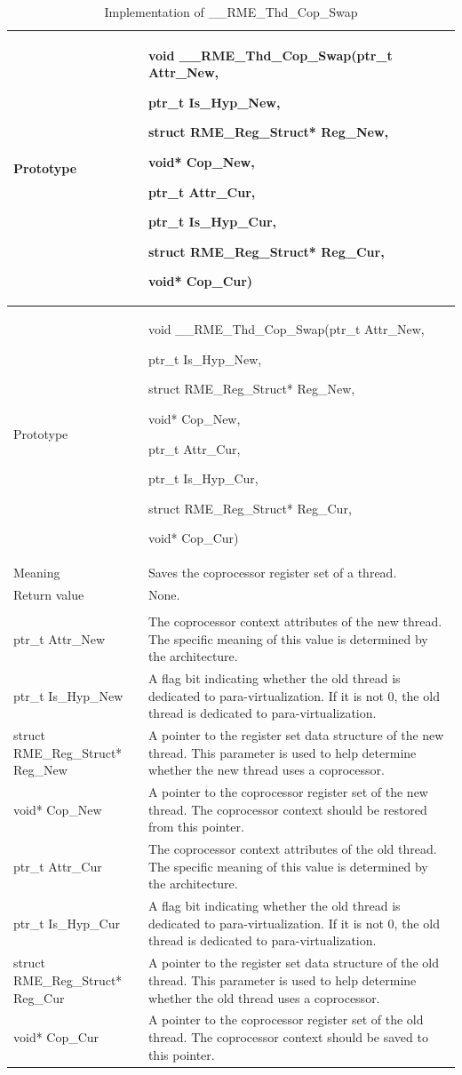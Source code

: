 \begin{xltabular}{\textwidth}{@{}>{\hsize\raggedright\arraybackslash}X>{\hsize\raggedright\arraybackslash}X@{}}
\caption{Implementation of \_\_RME\_Thd\_Cop\_Swap}\label{tab:7-72-rme-thd-cop-swap-implementation}\\
\toprule
Prototype\strut
 & void \_\_RME\_Thd\_Cop\_Swap(ptr\_t Attr\_New,

ptr\_t Is\_Hyp\_New,

struct RME\_Reg\_Struct* Reg\_New,

void* Cop\_New,

ptr\_t Attr\_Cur,

ptr\_t Is\_Hyp\_Cur,

struct RME\_Reg\_Struct* Reg\_Cur,

void* Cop\_Cur)\strut
\tabularnewline
\endfirsthead
\toprule
Prototype\strut
 & void \_\_RME\_Thd\_Cop\_Swap(ptr\_t Attr\_New,

ptr\_t Is\_Hyp\_New,

struct RME\_Reg\_Struct* Reg\_New,

void* Cop\_New,

ptr\_t Attr\_Cur,

ptr\_t Is\_Hyp\_Cur,

struct RME\_Reg\_Struct* Reg\_Cur,

void* Cop\_Cur)\strut
\tabularnewline
\midrule
\endhead
\bottomrule
\endlastfoot
Meaning & Saves the coprocessor register set of a thread.\tabularnewline
Return value & None.\tabularnewline
{}\tabularnewline
ptr\_t Attr\_New & The coprocessor context attributes of the new thread. The specific meaning of this value is determined by the architecture.\tabularnewline
ptr\_t Is\_Hyp\_New & A flag bit indicating whether the old thread is dedicated to para-virtualization. If it is not 0, the old thread is dedicated to para-virtualization.\tabularnewline
struct RME\_Reg\_Struct* Reg\_New & A pointer to the register set data structure of the new thread. This parameter is used to help determine whether the new thread uses a coprocessor.\tabularnewline
void* Cop\_New & A pointer to the coprocessor register set of the new thread. The coprocessor context should be restored from this pointer.\tabularnewline
ptr\_t Attr\_Cur & The coprocessor context attributes of the old thread. The specific meaning of this value is determined by the architecture.\tabularnewline
ptr\_t Is\_Hyp\_Cur & A flag bit indicating whether the old thread is dedicated to para-virtualization. If it is not 0, the old thread is dedicated to para-virtualization.\tabularnewline
struct RME\_Reg\_Struct* Reg\_Cur & A pointer to the register set data structure of the old thread. This parameter is used to help determine whether the old thread uses a coprocessor.\tabularnewline
void* Cop\_Cur & A pointer to the coprocessor register set of the old thread. The coprocessor context should be saved to this pointer.\tabularnewline
\end{xltabular}
\nopagebreak[4]

